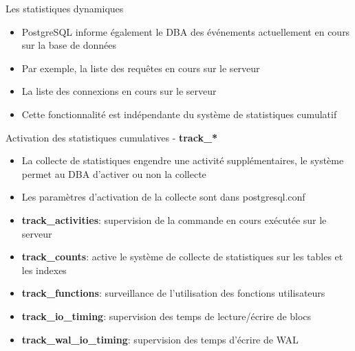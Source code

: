 
\begin{frame}[fragile]{Les statistiques dynamiques}

   \begin{itemize}
      \item PostgreSQL informe également le DBA des événements actuellement en cours sur la base de données
      \item Par exemple, la liste des requêtes en cours sur le serveur
      \item La liste des connexions en cours sur le serveur
      \item Cette fonctionnalité est indépendante du système de statistiques cumulatif
   \end{itemize}

\end{frame}


\begin{frame}[fragile]{Activation des statistiques cumulatives - \textbf{track\_*}}

   \begin{itemize}
      \item La collecte de statistiques engendre une activité supplémentaires, le système permet au DBA d'activer ou non la collecte
      \item Les paramètres d'activation de la collecte sont dans postgresql.conf
      \item \textbf{track\_activities}: supervision de la commande en cours exécutée sur le serveur
      \item \textbf{track\_counts}: active le système de collecte de statistiques sur les tables et les indexes
      \item \textbf{track\_functions}: surveillance de l'utilisation des fonctions utilisateurs
      \item \textbf{track\_io\_timing}: supervision des temps de lecture/écrire de blocs
      \item \textbf{track\_wal\_io\_timing}: supervision des temps d'écrire de WAL
   \end{itemize}

\begin{toile}
\end{toile}

\end{frame}

